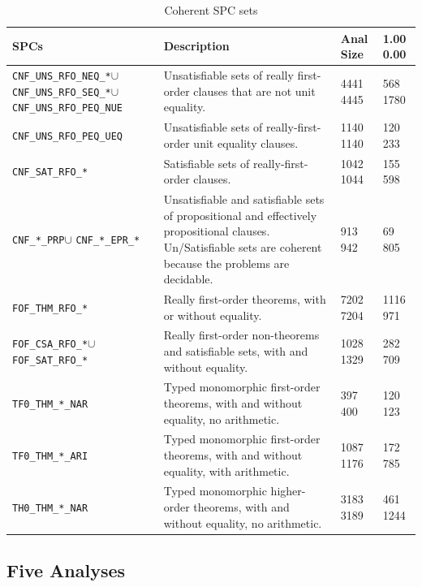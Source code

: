 \documentclass[runningheads]{llncs}
\begin{document}
\begin{table}[h!]
\renewcommand{\arraystretch}{1.5}
\center
\begin{tabular}{p{3.5cm}|p{6.5cm}|R{0.7cm}R{0.7cm}}
\hline
SPCs & Description & Anal Size & 1.00 0.00 \\
\hline
{\tt CNF\_UNS\_RFO\_NEQ\_*}\enspace$\cup$ {\tt CNF\_UNS\_RFO\_SEQ\_*}\enspace$\cup$
{\tt CNF\_UNS\_RFO\_PEQ\_NUE} &
Unsatisfiable sets of really first-order clauses that are not unit equality.
& 4441 4445 & 568 1780 \\
{\tt CNF\_UNS\_RFO\_PEQ\_UEQ} &
Unsatisfiable sets of really-first-order unit equality clauses.
& 1140 1140 & 120 233 \\
{\tt CNF\_SAT\_RFO\_*} &
Satisfiable sets of really-first-order clauses.
& 1042 1044 & 155 598 \\
{\tt CNF\_*\_PRP}\enspace$\cup$ {\tt CNF\_*\_EPR\_*} &
Unsatisfiable and satisfiable sets of propositional and effectively propositional clauses.
Un/Satisfiable sets are coherent because the problems are decidable.
& 913 942 & 69 805 \\
{\tt FOF\_THM\_RFO\_*} &
Really first-order theorems, with or without equality.
& 7202 7204 & 1116 971 \\
{\tt FOF\_CSA\_RFO\_*}\enspace$\cup$ {\tt FOF\_SAT\_RFO\_*} &
Really first-order non-theorems and satisfiable sets, with and without equality.
& 1028 1329 & 282 709 \\
{\tt TF0\_THM\_*\_NAR} &
Typed monomorphic first-order theorems, with and without equality, no arithmetic.
& 397 400 & 120 123 \\
{\tt TF0\_THM\_*\_ARI} &
Typed monomorphic first-order theorems, with and without equality, with arithmetic.
& 1087 1176 & 172 785 \\
{\tt TH0\_THM\_*\_NAR} &
Typed monomorphic higher-order theorems, with and without equality, no arithmetic.
& 3183 3189 & 461 1244 \\
\hline
\end{tabular}
\vspace*{0.5em}
\caption{Coherent SPC sets}
\label{SPCSetsTable}
\end{table}

\subsection{Five Analyses}
\label{AnalysisTypes}
\end{document}
